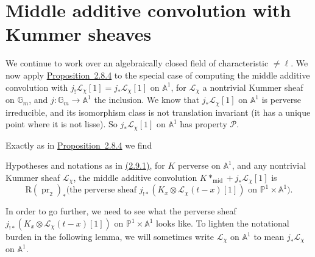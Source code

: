 \section{Middle additive convolution with Kummer sheaves}\label{sec:2.9}

We continue to work over an algebraically closed field of characteristic
\(\neq\ell\). We now apply \hyperref[prop:2.8.4]{Proposition~2.8.4} to the special case of computing the middle
additive convolution with \(j_!\mathcal{L}_\chi[1]=j_*\mathcal{L}_\chi[1]\) on
\(\mathbb{A}^1\), for \(\mathcal{L}_\chi\) a nontrivial Kummer sheaf on
\(\mathbb{G}_m\), and \(j:\mathbb{G}_m\to\mathbb{A}^1\) the inclusion. We know
that \(j_*\mathcal{L}_\chi[1]\) on \(\mathbb{A}^1\) is perverse irreducible,
and its isomorphism class is not translation invariant (it has a unique point
where it is not lisse). So \(j_*\mathcal{L}_\chi[1]\) on \(\mathbb{A}^1\) has
property \(\mathcal{P}\).

Exactly as in \hyperref[prop:2.8.4]{Proposition~2.8.4} we find

Hypotheses and notations as in \hyperref[par:2.9.1]{(2.9.1)}, for \(K\) perverse on
\(\mathbb{A}^1\), and any nontrivial Kummer sheaf \(\mathcal{L}_\chi\), the
middle additive convolution \(K*_{\mathrm{mid}}+j_*\mathcal{L}_\chi[1]\) is
\[
  \mathrm{R}(\operatorname{pr}_2)_*
  \bigl(\text{the perverse sheaf }
  j_{!*}(K_x\otimes\mathcal{L}_\chi(t-x)[1])
  \text{ on }\mathbb{P}^1\times\mathbb{A}^1\bigr).
\]

In order to go further, we need to see what the perverse sheaf
\(j_{!*}(K_x\otimes\mathcal{L}_\chi(t-x)[1])\) on
\(\mathbb{P}^1\times\mathbb{A}^1\) looks like. To lighten the notational
burden in the following lemma, we will sometimes write \(\mathcal{L}_\chi\) on
\(\mathbb{A}^1\) to mean \(j_*\mathcal{L}_\chi\) on \(\mathbb{A}^1\).

